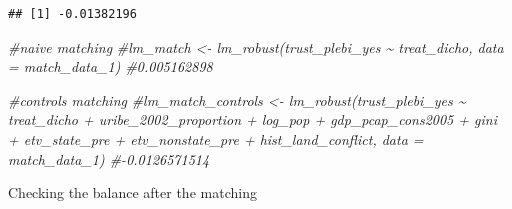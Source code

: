 \documentclass[
]{article}
\newenvironment{Shaded}{\begin{snugshade}}{\end{snugshade}}
\newcommand{\CommentTok}[1]{\textcolor[rgb]{0.56,0.35,0.01}{\textit{#1}}}
\newcommand{\DecValTok}[1]{\textcolor[rgb]{0.00,0.00,0.81}{#1}}
\newcommand{\FunctionTok}[1]{\textcolor[rgb]{0.13,0.29,0.53}{\textbf{#1}}}
\newcommand{\NormalTok}[1]{#1}
\newcommand{\SpecialCharTok}[1]{\textcolor[rgb]{0.81,0.36,0.00}{\textbf{#1}}}
\begin{document}
\begin{Shaded}
\end{Shaded}

\begin{verbatim}
## [1] -0.01382196
\end{verbatim}

\begin{Shaded}
\begin{Highlighting}[]
\CommentTok{\#naive matching}
\CommentTok{\#lm\_match \textless{}{-} lm\_robust(trust\_plebi\_yes \textasciitilde{} treat\_dicho, data = match\_data\_1) \#0.005162898}

\CommentTok{\#controls matching}
\CommentTok{\#lm\_match\_controls \textless{}{-} lm\_robust(trust\_plebi\_yes \textasciitilde{} treat\_dicho + uribe\_2002\_proportion + log\_pop + gdp\_pcap\_cons2005 +  gini + etv\_state\_pre + etv\_nonstate\_pre + hist\_land\_conflict, data = match\_data\_1) \#{-}0.0126571514}
\end{Highlighting}
\end{Shaded}

Checking the balance after the matching
\end{document}
